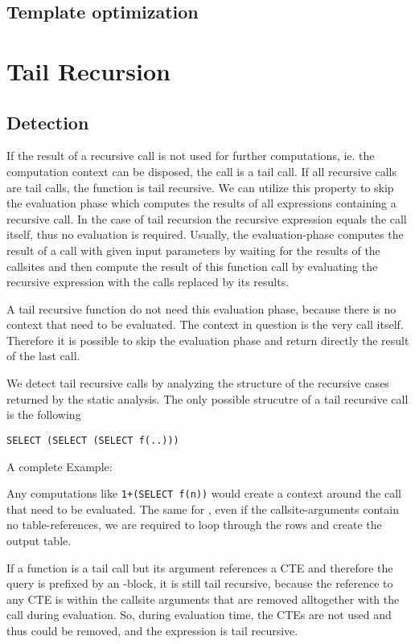 \subsection{Template optimization}

\section{Tail Recursion}
\subsection{Detection}
If the result of a recursive call is not used for further computations, ie. the computation context can be disposed, the call is a tail call. If all recursive calls are tail calls, the function is tail recursive. We can utilize this property to skip the evaluation phase which computes the results of all expressions containing a recursive call. In the case of tail recursion the recursive expression equals the call itself, thus no evaluation is required. Usually, the evaluation-phase computes the result of a call with given input parameters by waiting for the results of the callsites and then compute the result of this function call by evaluating the recursive expression with the calls replaced by its results.

A tail recursive function do not need this evaluation phase, because there is no context that need to be evaluated. The context in question is the very call itself. Therefore it is possible to skip the evaluation phase and return directly the result of the last call.

We detect tail recursive calls by analyzing the structure of the recursive cases returned by the static analysis. The only possible strucutre of a tail recursive call is the following
\begin{verbatim}
SELECT (SELECT (SELECT f(..)))
\end{verbatim}
A complete Example:

Any computations like \texttt{1+(SELECT f(n))} would create a context around the call that need to be evaluated. The same for \FROM, even if the callsite-arguments contain no table-references, we are required to loop through the rows and create the output table.

If a function is a tail call but its argument references a CTE and therefore the query is prefixed by an \WITH-block, it is still tail recursive, because the reference to any CTE is within the callsite arguments that are removed alltogether with the call during evaluation. So, during evaluation time, the CTEs are not used and thus could be removed, and the expression is tail recursive.
